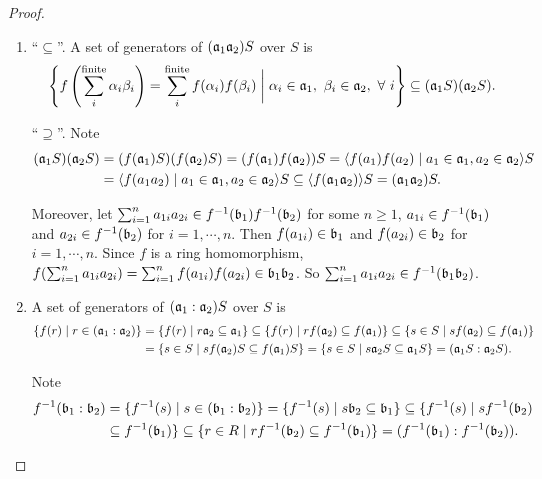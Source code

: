 \begin{proof}
\begin{enumerate}
        \item 
            ``$\subseteq$''. A set of generators of $(\mathfrak{a}_1\mathfrak{a}_2)S$ over $S$ is 
            \[\left\{f\left(\sum_i^{\text{finite}}\alpha_i\beta_i\right) = \sum_i^{\text{finite}} f(\alpha_i)f(\beta_i) \mathrel{\bigg |} \alpha_i \in \mathfrak{a}_1,\ \beta_i \in \mathfrak{a}_2, \ \forall \  i\right\} \subseteq (\mathfrak{a}_1S)(\mathfrak{a}_2S).\] 
            \par
            ``$\supseteq$''. Note 
            \begin{align*}
                (\mathfrak{a}_1S)(\mathfrak{a}_2S) &= (f(\mathfrak{a}_1)S)(f(\mathfrak{a}_2)S) = (f(\mathfrak{a}_1)f(\mathfrak{a}_2))S = \langle f(a_1)f(a_2) \mid a_1 \in \mathfrak{a}_1,a_2 \in \mathfrak{a}_2 \rangle S \\
                                   &= \langle f(a_1a_2) \mid a_1 \in \mathfrak{a}_1,a_2 \in \mathfrak{a}_2 \rangle S \subseteq \langle f(\mathfrak{a}_1\mathfrak{a}_2) \rangle S = (\mathfrak{a}_1\mathfrak{a}_2)S. 
            \end{align*}
            \par Moreover, let $\sum_{i=1}^{n}a_{1i}a_{2i} \in f^{-1}(\mathfrak{b}_1)f^{-1}(\mathfrak{b}_2)$ for some $n \geq 1$, $a_{1i} \in f^{-1}(\mathfrak{b}_1)$ and $a_{2i} \in f^{-1}(\mathfrak{b}_2)$ for $i = 1,\cdots,n$. Then $f(a_{1i}) \in \mathfrak{b}_1$ and $f(a_{2i}) \in \mathfrak{b}_2$ for $i = 1,\cdots,n$. Since $f$ is a ring homomorphism, $f(\sum_{i=1}^{n}a_{1i}a_{2i}) = \sum_{i=1}^{n} f(a_{1i}) f(a_{2i}) \in \mathfrak{b}_1\mathfrak{b}_2$. So $\sum_{i=1}^{n} a_{1i}a_{2i} \in f^{-1}(\mathfrak{b}_1 \mathfrak{b}_2)$.
        \item 
            A set of generators of $(\mathfrak{a}_1:\mathfrak{a}_2)S$ over $S$ is 
            \begin{align*}
                \{f(r) \mid r \in (\mathfrak{a}_1:\mathfrak{a}_2)\} &= \{f(r) \mid r \mathfrak{a}_2 \subseteq \mathfrak{a}_1\} \subseteq \{f(r) \mid r f(\mathfrak{a}_2) \subseteq f(\mathfrak{a}_1)\} \subseteq \{s \in S \mid sf(\mathfrak{a}_2) \subseteq f(\mathfrak{a}_1)\} \\
                                                    &= \{s \in S \mid s f(\mathfrak{a}_2)S \subseteq f(\mathfrak{a}_1)S \} = \{s \in S \mid s \mathfrak{a}_2 S \subseteq \mathfrak{a}_1 S\} = (\mathfrak{a}_1S:\mathfrak{a}_2S).
            \end{align*}
            \par Note 
            \begin{align*}
                f^{-1}(\ffb_1:\ffb_2) &= \{f^{-1}(s) \mid s \in (\ffb_1:\ffb_2)\} = \{f^{-1}(s) \mid s\ffb_2 \subseteq \ffb_1\} \subseteq \{f^{-1}(s) \mid sf^{-1}(\ffb_2) \\
                                      &\subseteq f^{-1}(\ffb_1)\} \subseteq \{r \in R\mid rf^{-1}(\ffb_2) \subseteq f^{-1}(\ffb_1)\} = (f^{-1}(\ffb_1):f^{-1}(\ffb_2)).

\end{align*}
\end{enumerate}
\end{proof}
